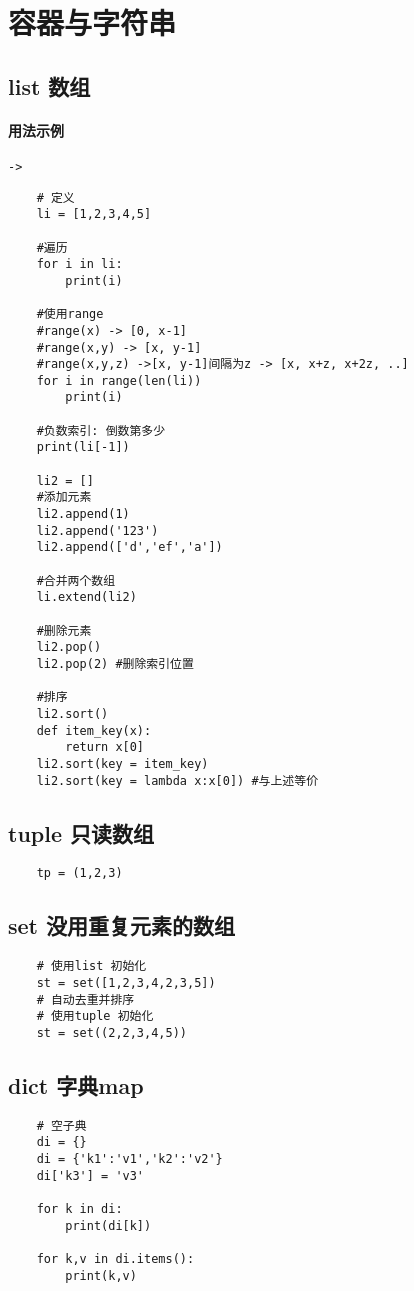\documentclass[UTF8,a4paper,12pt]{ctexbook}
\begin{document}
	\section{容器与字符串}
		\subsection{list 数组}
			\paragraph{用法示例}\verb|->|
				\begin{lstlisting}
	# 定义
	li = [1,2,3,4,5]
	
	#遍历
	for i in li:
		print(i)	
		
	#使用range
	#range(x) -> [0, x-1]
	#range(x,y) -> [x, y-1]	
	#range(x,y,z) ->[x, y-1]间隔为z -> [x, x+z, x+2z, ..]	
	for i in range(len(li))
		print(i)
		
	#负数索引: 倒数第多少
	print(li[-1])
	
	li2 = []
	#添加元素
	li2.append(1)
	li2.append('123')
	li2.append(['d','ef','a'])	
	
	#合并两个数组
	li.extend(li2)

	#删除元素
	li2.pop()
	li2.pop(2) #删除索引位置
	
	#排序
	li2.sort()
	def item_key(x):
		return x[0]
	li2.sort(key = item_key) 	
	li2.sort(key = lambda x:x[0]) #与上述等价 
				\end{lstlisting}
			
			
		\subsection{tuple 只读数组}
			\begin{lstlisting}
	tp = (1,2,3)
			\end{lstlisting}
		
		\subsection{set 没用重复元素的数组}
			\begin{lstlisting}
	# 使用list 初始化
	st = set([1,2,3,4,2,3,5]) 
	# 自动去重并排序
	# 使用tuple 初始化
	st = set((2,2,3,4,5))
			\end{lstlisting}	

		\subsection{dict 字典map}
			\begin{lstlisting}
	# 空子典
	di = {}
	di = {'k1':'v1','k2':'v2'}
	di['k3'] = 'v3'
	
	for k in di:
		print(di[k])
	
	for k,v in di.items():
		print(k,v)
			\end{lstlisting}
		
\end{document}
